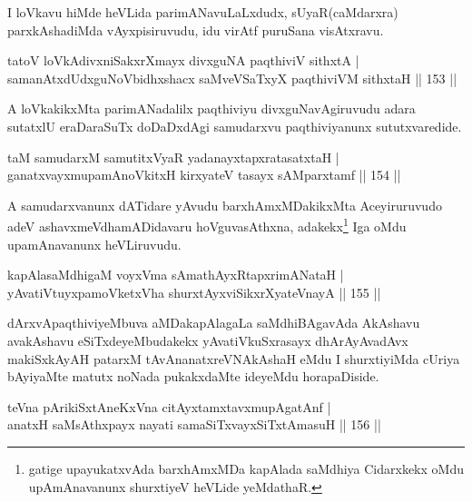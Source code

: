 \begin{artha}
I loVkavu hiMde heVLida parimANavuLaLxdudx, sUyaR(caMdarxra) parxkAshadiMda vAyxpisiruvudu, idu virAtf puruSana visAtxravu.
\end{artha}

\begin{shl}
tatoV loVkAdivxniSakxrXmayx divxguNA paqthiviV sithxtA |\\
samanAtxdUdxguNoV\s bidhxshacx saMveVSaTxyX paqthiviVM sithxtaH \hfill || 153 ||
\end{shl}

\begin{artha}
A loVkakikxMta parimANadalilx paqthiviyu divxguNavAgiruvudu adara sutatxlU eraDaraSuTx doDaDxdAgi samudarxvu paqthiviyanunx sututxvaredide.
\end{artha}

\begin{shl}
taM samudarxM samutitxVyaR yadanayxtapxratasatxtaH |\\
ganatxvayxmupamAnoVkitxH kirxyateV tasayx sAMparxtamf \hfill || 154 ||
\end{shl}

\begin{artha}
A samudarxvanunx dATidare yAvudu barxhAmxMDakikxMta Aceyiruruvudo adeV ashavxmeVdhamADidavaru hoVguvasAthxna, adakekx\footnote{gatige upayukatxvAda barxhAmxMDa  kapAlada saMdhiya Cidarxkekx oMdu upAmAnavanunx shurxtiyeV heVLide yeMdathaR.} Iga oMdu upamAnavanunx heVLiruvudu.
\end{artha}

\begin{shl}
kapAlasaMdhigaM voyxVma sAmathAyxRtapxrimANataH |\\
yAvatiVtuyxpamoVketxVha shurxtAyx\s \s viSikxrXyateV\s nayA \hfill || 155 ||
\end{shl}

\begin{artha}
dArxvApaqthiviyeMbuva aMDakapAlagaLa saMdhiBAgavAda AkAshavu avakAshavu eSiTxdeyeMbudakekx yAvatiVkuSxrasayx dhArAyAvadAvx makiSxkAyAH patarxM tAvAnanatxreVNAkAshaH eMdu I shurxtiyiMda cUriya bAyiyaMte matutx noNada pukakxdaMte ideyeMdu horapaDiside.
\end{artha}


\begin{shl}
teVna pArikiSxtAneKxVna citAyxtamxtavxmupAgatAnf |\\
anatxH saMsAthxpayx nayati samaSiTxvayxSiTxtAmasuH \hfill || 156 ||
\end{shl}

